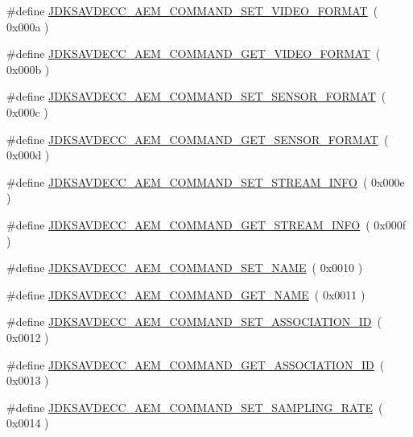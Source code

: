 \begin{DoxyCompactItemize}
\item 
\#define \hyperlink{group__command_gad696c0740e770ee7323d78a4cb4ac621}{J\+D\+K\+S\+A\+V\+D\+E\+C\+C\+\_\+\+A\+E\+M\+\_\+\+C\+O\+M\+M\+A\+N\+D\+\_\+\+S\+E\+T\+\_\+\+V\+I\+D\+E\+O\+\_\+\+F\+O\+R\+M\+AT}~( 0x000a )
\item 
\#define \hyperlink{group__command_gabae09ef9e0813f4553a6e06ba0561979}{J\+D\+K\+S\+A\+V\+D\+E\+C\+C\+\_\+\+A\+E\+M\+\_\+\+C\+O\+M\+M\+A\+N\+D\+\_\+\+G\+E\+T\+\_\+\+V\+I\+D\+E\+O\+\_\+\+F\+O\+R\+M\+AT}~( 0x000b )
\item 
\#define \hyperlink{group__command_ga1cb35e1392ecf7d35f5895d09dee968c}{J\+D\+K\+S\+A\+V\+D\+E\+C\+C\+\_\+\+A\+E\+M\+\_\+\+C\+O\+M\+M\+A\+N\+D\+\_\+\+S\+E\+T\+\_\+\+S\+E\+N\+S\+O\+R\+\_\+\+F\+O\+R\+M\+AT}~( 0x000c )
\item 
\#define \hyperlink{group__command_ga2fdb39e88172b64c6f78a5d476da02bf}{J\+D\+K\+S\+A\+V\+D\+E\+C\+C\+\_\+\+A\+E\+M\+\_\+\+C\+O\+M\+M\+A\+N\+D\+\_\+\+G\+E\+T\+\_\+\+S\+E\+N\+S\+O\+R\+\_\+\+F\+O\+R\+M\+AT}~( 0x000d )
\item 
\#define \hyperlink{group__command_gab717d775edf0abc460068c111cd0ee3b}{J\+D\+K\+S\+A\+V\+D\+E\+C\+C\+\_\+\+A\+E\+M\+\_\+\+C\+O\+M\+M\+A\+N\+D\+\_\+\+S\+E\+T\+\_\+\+S\+T\+R\+E\+A\+M\+\_\+\+I\+N\+FO}~( 0x000e )
\item 
\#define \hyperlink{group__command_ga24ecb3f0fabecfdd85f217f77279d2ea}{J\+D\+K\+S\+A\+V\+D\+E\+C\+C\+\_\+\+A\+E\+M\+\_\+\+C\+O\+M\+M\+A\+N\+D\+\_\+\+G\+E\+T\+\_\+\+S\+T\+R\+E\+A\+M\+\_\+\+I\+N\+FO}~( 0x000f )
\item 
\#define \hyperlink{group__command_ga67c447f46660cc499e4175923e99d32c}{J\+D\+K\+S\+A\+V\+D\+E\+C\+C\+\_\+\+A\+E\+M\+\_\+\+C\+O\+M\+M\+A\+N\+D\+\_\+\+S\+E\+T\+\_\+\+N\+A\+ME}~( 0x0010 )
\item 
\#define \hyperlink{group__command_gab5a8244c35a72f9d4dcded988c51d8e3}{J\+D\+K\+S\+A\+V\+D\+E\+C\+C\+\_\+\+A\+E\+M\+\_\+\+C\+O\+M\+M\+A\+N\+D\+\_\+\+G\+E\+T\+\_\+\+N\+A\+ME}~( 0x0011 )
\item 
\#define \hyperlink{group__command_ga56f8852f59512df441d1a5a8a5cba77e}{J\+D\+K\+S\+A\+V\+D\+E\+C\+C\+\_\+\+A\+E\+M\+\_\+\+C\+O\+M\+M\+A\+N\+D\+\_\+\+S\+E\+T\+\_\+\+A\+S\+S\+O\+C\+I\+A\+T\+I\+O\+N\+\_\+\+ID}~( 0x0012 )
\item 
\#define \hyperlink{group__command_ga3a755c3e6ec4b80c4a94b31746d4a44d}{J\+D\+K\+S\+A\+V\+D\+E\+C\+C\+\_\+\+A\+E\+M\+\_\+\+C\+O\+M\+M\+A\+N\+D\+\_\+\+G\+E\+T\+\_\+\+A\+S\+S\+O\+C\+I\+A\+T\+I\+O\+N\+\_\+\+ID}~( 0x0013 )
\item 
\#define \hyperlink{group__command_ga65253366a1e39d922ec9e1ef07ff6af7}{J\+D\+K\+S\+A\+V\+D\+E\+C\+C\+\_\+\+A\+E\+M\+\_\+\+C\+O\+M\+M\+A\+N\+D\+\_\+\+S\+E\+T\+\_\+\+S\+A\+M\+P\+L\+I\+N\+G\+\_\+\+R\+A\+TE}~( 0x0014 )

\end{DoxyCompactItemize}
